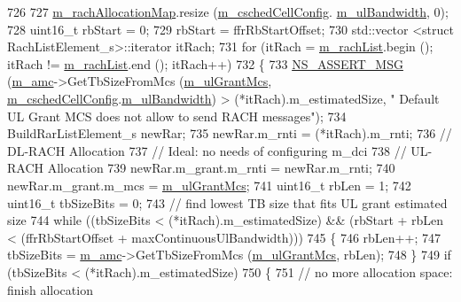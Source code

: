 \begin{DoxyCode}
726 
727   \hyperlink{classns3_1_1PfFfMacScheduler_a755c1bfd84bd392a07aa370cb4ced071}{m\_rachAllocationMap}.resize (\hyperlink{classns3_1_1PfFfMacScheduler_a0be1f7a1e78824b031e48208b8af1048}{m\_cschedCellConfig}.
      \hyperlink{structns3_1_1FfMacCschedSapProvider_1_1CschedCellConfigReqParameters_a5ab5b102878e6e7e7727a14af4a64d2f}{m\_ulBandwidth}, 0);
728   uint16\_t rbStart = 0;
729   rbStart = ffrRbStartOffset;
730   std::vector <struct RachListElement\_s>::iterator itRach;
731   \textcolor{keywordflow}{for} (itRach = \hyperlink{classns3_1_1PfFfMacScheduler_a850a31ab66c0a1d24207311ceee03ce7}{m\_rachList}.begin (); itRach != \hyperlink{classns3_1_1PfFfMacScheduler_a850a31ab66c0a1d24207311ceee03ce7}{m\_rachList}.end (); itRach++)
732     \{
733       \hyperlink{assert_8h_aff5ece9066c74e681e74999856f08539}{NS\_ASSERT\_MSG} (\hyperlink{classns3_1_1PfFfMacScheduler_a8ed3fd6ae921b6161a10c2c9b0e869a4}{m\_amc}->GetTbSizeFromMcs (\hyperlink{classns3_1_1PfFfMacScheduler_a915ee203b48875c6cb276bb46d866c2b}{m\_ulGrantMcs}, 
      \hyperlink{classns3_1_1PfFfMacScheduler_a0be1f7a1e78824b031e48208b8af1048}{m\_cschedCellConfig}.\hyperlink{structns3_1_1FfMacCschedSapProvider_1_1CschedCellConfigReqParameters_a5ab5b102878e6e7e7727a14af4a64d2f}{m\_ulBandwidth}) > (*itRach).m\_estimatedSize, \textcolor{stringliteral}{" Default UL
       Grant MCS does not allow to send RACH messages"});
734       BuildRarListElement\_s newRar;
735       newRar.m\_rnti = (*itRach).m\_rnti;
736       \textcolor{comment}{// DL-RACH Allocation}
737       \textcolor{comment}{// Ideal: no needs of configuring m\_dci}
738       \textcolor{comment}{// UL-RACH Allocation}
739       newRar.m\_grant.m\_rnti = newRar.m\_rnti;
740       newRar.m\_grant.m\_mcs = \hyperlink{classns3_1_1PfFfMacScheduler_a915ee203b48875c6cb276bb46d866c2b}{m\_ulGrantMcs};
741       uint16\_t rbLen = 1;
742       uint16\_t tbSizeBits = 0;
743       \textcolor{comment}{// find lowest TB size that fits UL grant estimated size}
744       \textcolor{keywordflow}{while} ((tbSizeBits < (*itRach).m\_estimatedSize) && (rbStart + rbLen < (ffrRbStartOffset + 
      maxContinuousUlBandwidth)))
745         \{
746           rbLen++;
747           tbSizeBits = \hyperlink{classns3_1_1PfFfMacScheduler_a8ed3fd6ae921b6161a10c2c9b0e869a4}{m\_amc}->GetTbSizeFromMcs (\hyperlink{classns3_1_1PfFfMacScheduler_a915ee203b48875c6cb276bb46d866c2b}{m\_ulGrantMcs}, rbLen);
748         \}
749       \textcolor{keywordflow}{if} (tbSizeBits < (*itRach).m\_estimatedSize)
750         \{
751           \textcolor{comment}{// no more allocation space: finish allocation}

\end{DoxyCode}
